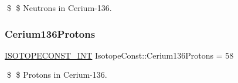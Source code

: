 \$ \$ Neutrons in Cerium-\/136. \mbox{\label{group___isotope_const-_cerium-_ce136_gafec670d77c2c3573c7fdbe90057f68e1}} 
\subsubsection{\texorpdfstring{Cerium136\+Protons}{Cerium136Protons}}
{\footnotesize\ttfamily \mbox{\hyperlink{group___isotope_const-_macros_ga5f18360b3e99483a35c32d789e62621c}{I\+S\+O\+T\+O\+P\+E\+C\+O\+N\+S\+T\+\_\+\+I\+NT}} Isotope\+Const\+::\+Cerium136\+Protons = 58}

\$ \$ Protons in Cerium-\/136. 